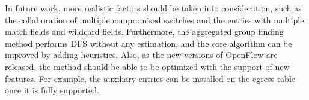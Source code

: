 \documentclass[conference]{IEEEtran}
\begin{document}
In future work, more realistic factors should be taken into consideration, such as the collaboration of multiple compromised switches and the entries with multiple match fields and wildcard fields. Furthermore, the aggregated group finding method performs DFS without any estimation, and the core algorithm can be improved by adding heuristics. Also, as the new versions of OpenFlow are released, the method should be able to be optimized with the support of new features. For example, the auxiliary entries can be installed on the egress table once it is fully supported.













\end{document}

